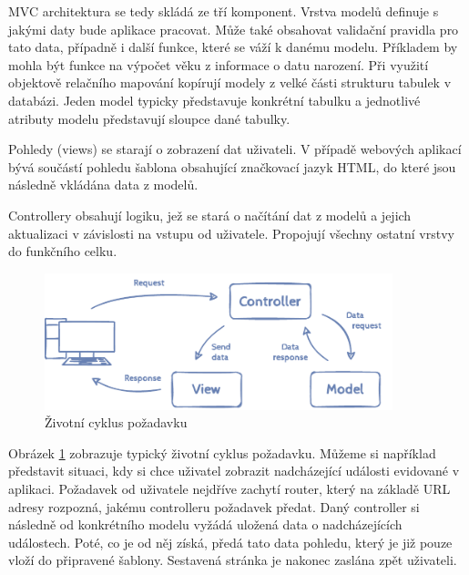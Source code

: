 MVC architektura se tedy skládá ze tří komponent. Vrstva modelů definuje s jakými daty bude aplikace pracovat. Může také obsahovat validační pravidla pro tato data, případně i další funkce, které se váží k danému modelu. Příkladem by mohla být funkce na výpočet věku z informace o datu narození. Při využití objektově relačního mapování kopírují modely z velké části strukturu tabulek v databázi. Jeden model typicky představuje konkrétní tabulku a jednotlivé atributy modelu představují sloupce dané tabulky.

Pohledy (views) se starají o zobrazení dat uživateli. V případě webových aplikací bývá součástí pohledu šablona obsahující značkovací jazyk HTML, do které jsou následně vkládána data z modelů.

Controllery obsahují logiku, jež se stará o načítání dat z modelů a jejich aktualizaci v závislosti na vstupu od uživatele. Propojují všechny ostatní vrstvy do funkčního celku.

\begin{figure}[h]
	\caption{Životní cyklus požadavku}
	\label{figure:mvc}
	\centering
	\includegraphics[width=0.9\textwidth]{images/mvc.pdf}
\end{figure}

Obrázek \ref{figure:mvc} zobrazuje typický životní cyklus požadavku. Můžeme si například představit situaci, kdy si chce uživatel zobrazit nadcházející události evidované v aplikaci. Požadavek od uživatele nejdříve zachytí router, který na základě URL adresy rozpozná, jakému controlleru požadavek předat. Daný controller si následně od konkrétního modelu vyžádá uložená data o nadcházejících událostech. Poté, co je od něj získá, předá tato data pohledu, který je již pouze vloží do připravené šablony. Sestavená stránka je nakonec zaslána zpět uživateli.

